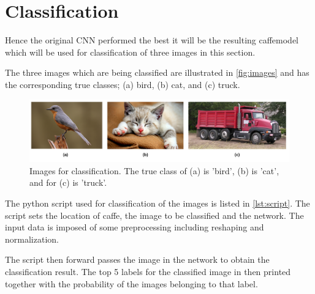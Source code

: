 \graphicspath{{Chapters/Project/}}

\section{Classification} %
\label{sec:classification}

Hence the original CNN performed the best it will be the resulting caffemodel which will be used for classification of three images in this section.

The three images which are being classified are illustrated in \autoref{fig:images} and has the corresponding true classes; (a) bird, (b) cat, and (c) truck.

\begin{figure}[H]
  \centering
  \includegraphics[width=\columnwidth]{Img/classification-images.pdf}
  \caption{Images for classification. The true class of (a) is 'bird', (b) is 'cat', and for (c) is 'truck'. }
  \label{fig:images}
\end{figure}

The python script used for classification of the images is listed in \autoref{lst:script}. The script sets the location of caffe, the image to be classified and the network. The input data is imposed of some preprocessing including reshaping and normalization.

The script then forward passes the image in the network to obtain the classification result. The top 5 labels for the classified image in then printed together with the probability of the images belonging to that label.


